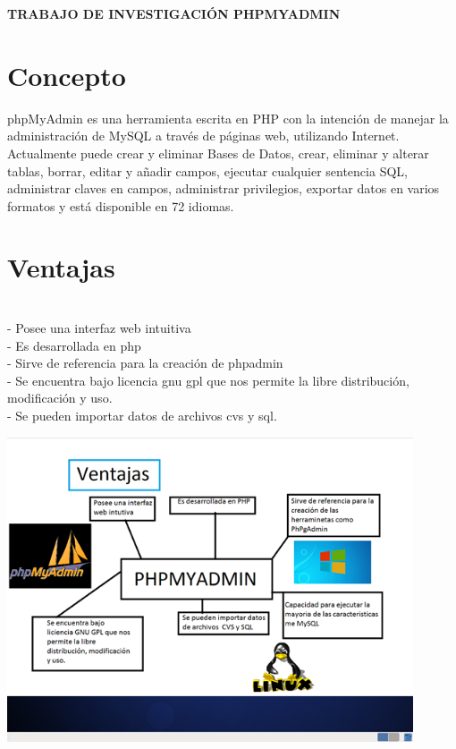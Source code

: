 
\begin{Large}
\begin{center}
\textbf{TRABAJO DE INVESTIGACIÓN PHPMYADMIN} \\
\end{center}
\end{Large}

\section{Concepto} 


\begin{itemize}

phpMyAdmin es una herramienta escrita en PHP con la intención de manejar la administración de MySQL a través de páginas web, utilizando Internet. Actualmente puede crear y eliminar Bases de Datos, crear, eliminar y alterar tablas, borrar, editar y añadir campos, ejecutar cualquier sentencia SQL, administrar claves en campos, administrar privilegios, exportar datos en varios formatos y está disponible en 72 idiomas.

\end{itemize} 

\section{Ventajas} 

\begin{itemize}
\\- Posee una interfaz web intuitiva
\\- Es desarrollada en php
\\- Sirve de referencia para la creación de phpadmin
\\- Se encuentra bajo licencia gnu gpl que nos permite la libre distribución, modificación y uso.
\\- Se pueden importar datos de archivos cvs y sql.
\\
\end{itemize} 
        \begin{center}
		\includegraphics[width=12cm]{./Imagenes/a}
		\end{center}
\\\
